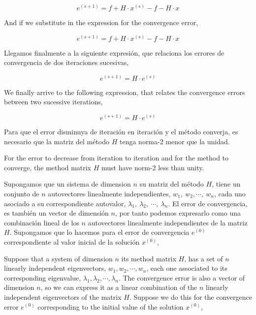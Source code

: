 \begin{paracol}{2}
\begin{equation*}
e^{(s+1)}=f+H\cdot x^{(s)}-f-H\cdot x
\end{equation*}

\switchcolumn

And if we substitute in the expression for the convergence error,

\begin{equation*}
e^{(s+1)}=f+H\cdot x^{(s)}-f-H\cdot x
\end{equation*}

\switchcolumn

Llegamos finalmente a la siguiente expresión, que relaciona los errores de convergencia de dos iteraciones sucesivas,

\begin{equation*}
e^{(s+1)}=H\cdot e^{(s)}
\end{equation*}

\switchcolumn

We finally arrive to the following expression, that relates the convergence errors between two sucessive iterations,

\begin{equation*}
e^{(s+1)}=H\cdot e^{(s)}
\end{equation*}

\switchcolumn
Para que el error disminuya de iteración en iteración y el método converja, es necesario que la matriz del método $H$ tenga norma-2  menor que la unidad.

\switchcolumn
For the error to decrease from iteration to iteration and for the method to converge, the method matrix $H$ must have norm-2 less than unity.

\switchcolumn
Supongamos que un sistema de dimension $n$ su matriz del método $H$, tiene un conjunto de $n$ autovectores linealmente independientes, $w_1, \ w_2, \cdots, \ w_n$, cada uno asociado a su correspondiente autovalor, $\lambda_1, \ \lambda_2, \ \cdots,\ \lambda_n$. El error de convergencia, es también un vector de dimensión $n$, por tanto podemos expresarlo como una combinación lineal de los $n$ autovectores linealmente independientes de la matriz $H$. Supongamos que lo hacemos para el error de convergencia $e^{(0)}$ correspondiente al valor inicial de la solución $x^{(0)}$,

\switchcolumn
Suppose that a system of dimension $n$ its method matrix $H$, has a set of $n$ linearly independent eigenvectors, $w_1, w_2, \cdots, w_n$, each one associated to its corresponding eigenvalue, $\lambda_1, \lambda_2, \cdots, \lambda_n$. The convergence error is also a vector of dimension $n$, so we can express it as a linear combination of the $n$ linearly independent eigenvectors of the matrix $H$. Suppose we do this for the convergence error $e^{(0)}$ corresponding to the initial value of the solution $x^{(0)}$,
\end{paracol}

